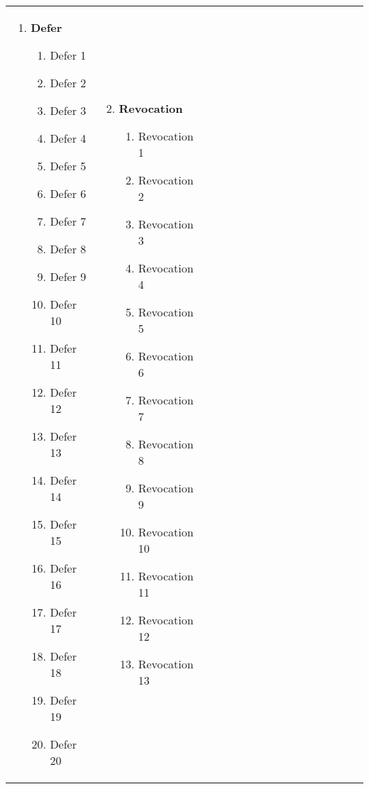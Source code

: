 \renewcommand{\labelenumii}{\arabic{enumii}.}
\begin{tabular}{@{} p{0.25\linewidth} p{0.25\linewidth} p{0.25\linewidth} p{0.25\linewidth}}
\begin{enumerate}
	\item \textbf{Defer}
	\begin{enumerate}
		\item Defer 1
		\item Defer 2
		\item Defer 3
		\item Defer 4
		\item Defer 5
		\item Defer 6
		\item Defer 7
		\item Defer 8
		\item Defer 9
		\item Defer 10
		\item Defer 11
		\item Defer 12
		\item Defer 13
		\item Defer 14
		\item Defer 15
		\item Defer 16
		\item Defer 17
		\item Defer 18
		\item Defer 19
		\item Defer 20
	\end{enumerate}
\end{enumerate} &
\begin{enumerate}
	\setcounter{enumi}{1}
	\item \textbf{Revocation}
	\begin{enumerate}
		\item Revocation 1
		\item Revocation 2
		\item Revocation 3
		\item Revocation 4
		\item Revocation 5
		\item Revocation 6
		\item Revocation 7
		\item Revocation 8
		\item Revocation 9
		\item Revocation 10
		\item Revocation 11
		\item Revocation 12
		\item Revocation 13

\end{enumerate}
\end{enumerate}
\end{tabular}
